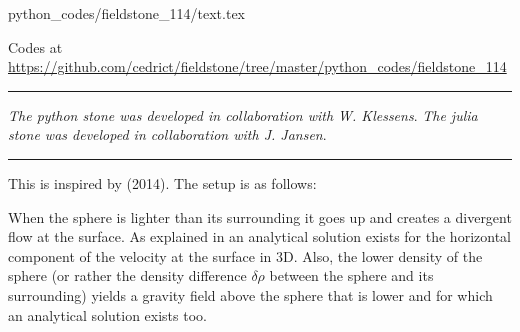 \begin{flushright} {\tiny {\color{gray} python\_codes/fieldstone\_114/text.tex}} \end{flushright}

%

\begin{center}
Codes at \url{https://github.com/cedrict/fieldstone/tree/master/python_codes/fieldstone_114}
\end{center}

\par\noindent\rule{\textwidth}{0.4pt}

{\sl The python stone was developed in collaboration with W. Klessens}. 
{\sl The julia stone was developed in collaboration with J. Jansen}. 

\par\noindent\rule{\textwidth}{0.4pt}

This \stone is inspired by \textcite{bakp14} (2014).
The setup is as follows:

\begin{center}
\end{center}

When the sphere is lighter than its surrounding it goes up and creates a 
divergent flow at the surface. As explained in \textcite{bakp14} an analytical 
solution exists for the horizontal component of the velocity at the surface in 3D. 
Also, the lower density of the sphere (or rather the density difference $\delta\rho$
between the sphere and its surrounding) yields a gravity field 
above the sphere that is lower and for which an analytical solution exists too.

